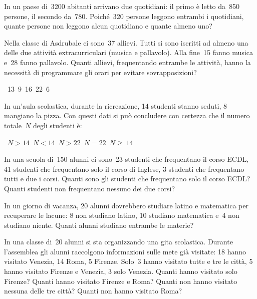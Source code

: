 \begin{multicols}{2}
\begin{esercizio}
\label{ese:7.33}
In un paese di~3200 abitanti arrivano due quotidiani: il primo è letto da~850
persone, il secondo da~780. Poiché~320 persone leggono entrambi i
quotidiani, quante persone non leggono alcun quotidiano e quante almeno uno?
\end{esercizio}

\begin{esercizio}
\label{ese:7.34}
Nella classe di Asdrubale ci sono~37 allievi. Tutti si sono iscritti
ad almeno una delle due attività extracurriculari (musica e
pallavolo). Alla fine~15 fanno musica e~28 fanno pallavolo.
Quanti allievi, frequentando entrambe le attività, hanno la
necessità di programmare gli orari per evitare sovrapposizioni?
\begin{center}
 \boxA~13\quad\boxB~9\quad\boxC~16\quad\boxD~22\quad\boxE~6
\end{center}
\end{esercizio}

\begin{esercizio}
\label{ese:7.35}
In un'aula scolastica, durante la ricreazione, 14
studenti stanno seduti, 8 mangiano la pizza. Con questi dati si può
concludere con certezza che il numero totale~$N$ degli studenti è:
\begin{center}
 \boxA\quad~$N>14$\quad\boxB\quad~$N<14$\quad\boxC\quad~$N>22$\quad\boxD\quad~$N 
= 22$\quad\boxE\quad~$N\geqslant~14$
\end{center}
\end{esercizio}

\begin{esercizio}
\label{ese:7.36}
In una scuola di~150 alunni ci sono~23 studenti che frequentano il corso ECDL, 
41 studenti che frequentano solo il corso di Inglese, 3
studenti che frequentano tutti e due i corsi. Quanti sono gli studenti che 
frequentano solo il corso ECDL? Quanti studenti non frequentano
nessuno dei due corsi?
\end{esercizio}

\begin{esercizio}
\label{ese:7.37}
In un giorno di vacanza, 20 alunni dovrebbero studiare latino e
matematica per recuperare le lacune: 8 non studiano latino, 10 studiano
matematica e~4 non studiano niente. Quanti alunni studiano entrambe le
materie?
\end{esercizio}

\begin{esercizio}
\label{ese:7.38}
In una classe di~20 alunni si sta organizzando una gita
scolastica. Durante l'assemblea gli alunni raccolgono
informazioni sulle mete già visitate: 18 hanno visitato Venezia, 14
Roma, 5 Firenze. Solo~3 hanno visitato tutte e tre le città, 5 hanno
visitato Firenze e Venezia, 3 solo Venezia. Quanti hanno visitato solo
Firenze? Quanti hanno visitato Firenze e Roma? Quanti non hanno
visitato nessuna delle tre città? Quanti non hanno visitato Roma?
\end{esercizio}
\end{multicols}

